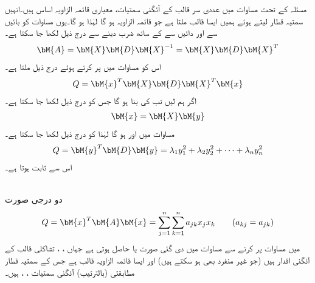 مسئلہ  کے تحت مساوات  میں  عددی سر قالب  کے آئگنی سمتیات، معیاری قائمہ الزاویہ اساس ہیں۔انہیں سمتیہ قطار لیتے ہوئے ہمیں ایسا قالب  ملتا ہے جو قائمہ الزاویہ ہو گا لہٰذا  ہو گا۔یوں مساوات  کو بائیں سے  اور دائیں سے  کے ساتھ ضرب دینے سے درج ذیل لکھا جا سکتا ہے۔
\begin{align*}
\bM{A}=\bM{X}\bM{D}\bM{X}^{-1}=\bM{X}\bM{D}\bM{X}^T
\end{align*}
اس کو مساوات  میں پر کرتے ہوئے درج ذیل ملتا ہے۔
\begin{align}\label{مساوات_آئگنی_صدر_وتر_الف}
Q=\bM{x}^T\bM{X}\bM{D}\bM{X}^T\bM{x}
\end{align}
اگر ہم  لیں تب  کی بنا  ہو گا جس کو درج ذیل لکھا جا سکتا ہے۔
\begin{align}\label{مساوات_آئگنی_صدر_وتر_ب}
\bM{x}=\bM{X}\bM{y}
\end{align}  
مساوات  میں  اور  ہو گا لہٰذا  کو درج ذیل لکھا جا سکتا ہے۔
\begin{align}\label{مساوات_آئگنی_صدر_وتر_پ}
Q=\bM{y}^T\bM{D}\bM{y}=\lambda_1y_1^2+\lambda_2y_2^2+\cdots+\lambda_ny_n^2
\end{align}
اس سے    ثابت ہوتا ہے۔

\quad {}\\
دو درجی صورت
\begin{align}\label{مساوات_آئگنی_صدر_وتر_ت}
Q=\bM{x}^T\bM{A}\bM{x}=\sum_{j=1}^{n}\sum_{k=1}^{n}a_{jk}x_jx_k\quad \quad (a_{kj}=a_{jk})
\end{align}
میں مساوات  پر کرنے سے مساوات  میں دی گئی  صورت یا  حاصل ہوتی ہے جہاں ، ،  تشاکلی قالب  کے آئگنی اقدار ہیں (جو غیر منفرد بھی ہو سکتے ہیں) اور  ایسا قائمہ الزاویہ قالب ہے جس کے سمتیہ قطار  مطابقتی (بالترتیب)  آئگنی سمتیات ، ،  ہیں۔

